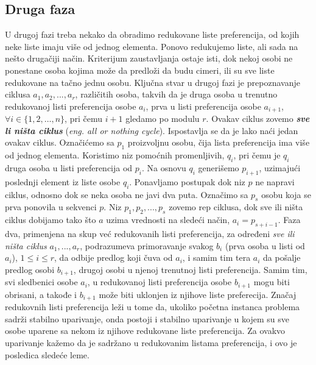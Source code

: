\documentclass[a4paper]{article}
\begin{document}
\subsection{Druga faza}
U drugoj fazi treba nekako da obradimo redukovane liste preferencija, od kojih neke liste imaju više od jednog elementa. Ponovo redukujemo liste, ali sada na nešto drugačiji način. Kriterijum zaustavljanja ostaje isti, dok nekoj osobi ne ponestane osoba kojima može da predloži da budu cimeri, ili su sve liste redukovane na tačno jednu osobu.
\newline
Ključna stvar u drugoj fazi je prepoznavanje ciklusa $a_1, a_2, ..., a_r$, različitih osoba, takvih da je druga osoba u trenutno redukovanoj listi preferencija osobe $a_i$, prva u listi preferencija osobe $a_{i+1}$, \(\forall i \in \{1, 2, \ldots, n\}\), pri čemu $i+1$ gledamo po modulu $r$. Ovakav ciklus zovemo \textit{\textbf{sve li ništa ciklus}} (\textit{eng. all or nothing cycle}).
\newline
Ispostavlja se da je lako naći jedan ovakav ciklus. Označićemo sa $p_1$ proizvoljnu osobu, čija lista preferencija ima više od jednog elementa. Koristimo niz pomoćnih promenljivih, $q_i$, pri čemu je $q_i$ druga osoba u listi preferencija od $p_i$. Na osnovu $q_i$ generišemo $p_{i+1}$, uzimajući poslednji element iz liste osobe $q_i$. Ponavljamo postupak dok niz $p$ ne napravi ciklus, odnosno dok se neka osoba ne javi dva puta. Označimo sa $p_s$ osobu koja se prva ponovila u sekvenci $p$. Niz $p_1, p_2, ..., p_s$ zovemo rep ciklusa, dok sve ili ništa ciklus dobijamo tako što $a$ uzima vrednosti na sledeći način, $a_i = p_{s+i-1}$.
\newline
Faza dva, primenjena na skup već redukovanih listi preferencija, za određeni \textit{sve ili ništa ciklus} $a_1, ..., a_r$, podrazumeva primoravanje svakog $b_i$ (prva osoba u listi od $a_i$), $1\leq i \leq r$, da odbije predlog koji čuva od $a_i$, i samim tim tera $a_i$ da pošalje predlog osobi $b_{i+1}$, drugoj osobi u njenoj trenutnoj listi preferencija. Samim tim, svi sledbenici osobe $a_i$, u redukovanoj listi preferencija osobe $b_{i+1}$ mogu biti obrisani, a takođe i $b_{i+1}$ može biti uklonjen iz njihove liste preferecija.
\newline
Značaj redukovnih listi preferencija leži u tome da, ukoliko početna instanca problema sadrži stabilno uparivanje, onda postoji i stabilno uparivanje u kojem su sve osobe uparene sa nekom iz njihove redukovane liste preferencija. Za ovakvo uparivanje kažemo da je sadržano u redukovanim listama preferencija, i ovo je posledica sledeće leme.
\end{document}

